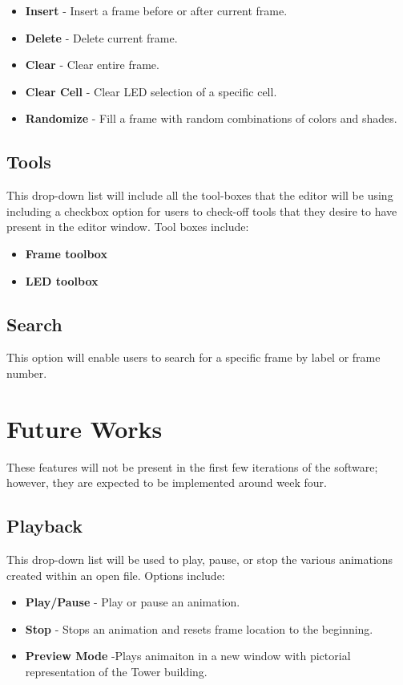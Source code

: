 \documentclass[preprint,12pt]{article}
\begin{document}
\begin{itemize}
\item \textbf{Insert} - Insert a frame before or after current frame.
\item \textbf{Delete} - Delete current frame.
\item \textbf{Clear} - Clear entire frame.
\item \textbf{Clear Cell} - Clear LED selection of a specific cell.
\item \textbf{Randomize} - Fill a frame with random combinations of colors and shades.
\end{itemize}

\subsection*{Tools}

{This drop-down list will include all the tool-boxes that the editor will be using including a checkbox option for users to check-off tools that they desire to have present in the editor window. Tool boxes include:}

\begin{itemize}
\item \textbf{Frame toolbox}
\item \textbf{LED toolbox}

\end{itemize}

\subsection*{Search}

{This option will enable users to search for a specific frame by label or frame number.}

\section*{Future Works}

{These features will not be present in the first few iterations of the software; however, they are expected to be implemented around week four. }

\subsection*{Playback}

{This drop-down list will be used to play, pause, or stop the various animations created within an open file. Options include: }
\begin{itemize}
\item \textbf{Play/Pause} - Play or pause an animation.
\item \textbf{Stop} - Stops an animation and resets frame location to the beginning.
\item \textbf{Preview Mode} -Plays animaiton in a new window with pictorial representation of the Tower building.

\end{itemize}
\end{document}
